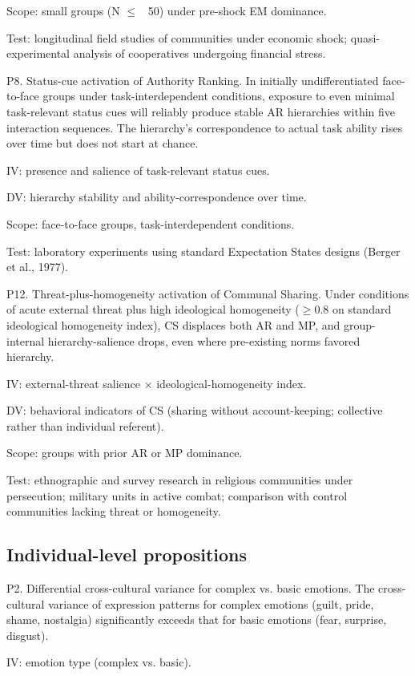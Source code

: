 \documentclass[12pt,a4paper]{article}
\begin{document}
Scope: small groups (N $\leq$ ~50) under pre-shock EM dominance.

Test: longitudinal field studies of communities under economic shock; quasi-experimental analysis of cooperatives undergoing financial stress.


P8. Status-cue activation of Authority Ranking. In initially undifferentiated face-to-face groups under task-interdependent conditions, exposure to even minimal task-relevant status cues will reliably produce stable AR hierarchies within five interaction sequences. The hierarchy's correspondence to actual task ability rises over time but does not start at chance.


IV: presence and salience of task-relevant status cues.

DV: hierarchy stability and ability-correspondence over time.

Scope: face-to-face groups, task-interdependent conditions.

Test: laboratory experiments using standard Expectation States designs (Berger et al., 1977).


P12. Threat-plus-homogeneity activation of Communal Sharing. Under conditions of acute external threat plus high ideological homogeneity ($\geq$0.8 on standard ideological homogeneity index), CS displaces both AR and MP, and group-internal hierarchy-salience drops, even where pre-existing norms favored hierarchy.


IV: external-threat salience × ideological-homogeneity index.

DV: behavioral indicators of CS (sharing without account-keeping; collective rather than individual referent).

Scope: groups with prior AR or MP dominance.

Test: ethnographic and survey research in religious communities under persecution; military units in active combat; comparison with control communities lacking threat or homogeneity.

\subsection{Individual-level propositions}

P2. Differential cross-cultural variance for complex vs. basic emotions. The cross-cultural variance of expression patterns for complex emotions (guilt, pride, shame, nostalgia) significantly exceeds that for basic emotions (fear, surprise, disgust).


IV: emotion type (complex vs. basic).
\end{document}

